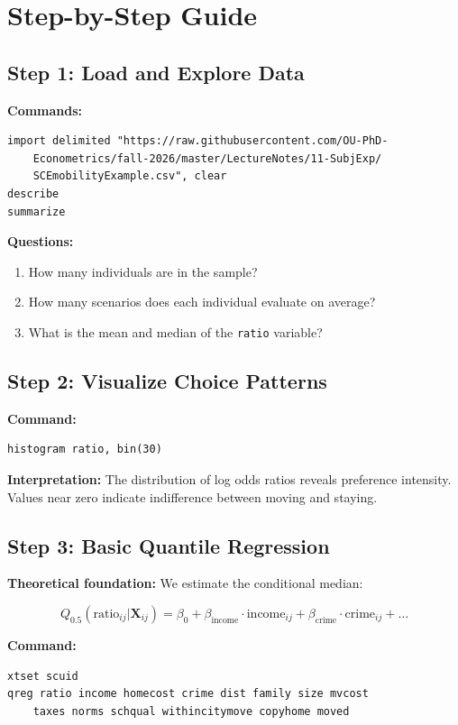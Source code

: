 \documentclass[12pt]{article}
\begin{document}
\section{Step-by-Step Guide}

\subsection{Step 1: Load and Explore Data}

\textbf{Commands:}
\begin{verbatim}
import delimited "https://raw.githubusercontent.com/OU-PhD-
    Econometrics/fall-2026/master/LectureNotes/11-SubjExp/
    SCEmobilityExample.csv", clear
describe
summarize
\end{verbatim}

\textbf{Questions:}
\begin{enumerate}
    \item How many individuals are in the sample?
    \item How many scenarios does each individual evaluate on average?
    \item What is the mean and median of the \texttt{ratio} variable?
\end{enumerate}

\subsection{Step 2: Visualize Choice Patterns}

\textbf{Command:}
\begin{verbatim}
histogram ratio, bin(30)
\end{verbatim}

\textbf{Interpretation:} The distribution of log odds ratios reveals preference intensity. Values near zero indicate indifference between moving and staying.

\subsection{Step 3: Basic Quantile Regression}

\textbf{Theoretical foundation:} We estimate the conditional median:

$$Q_{0.5}(\text{ratio}_{ij} | \mathbf{X}_{ij}) = \beta_0 + \beta_{\text{income}} \cdot \text{income}_{ij} + \beta_{\text{crime}} \cdot \text{crime}_{ij} + \ldots$$

\textbf{Command:}
\begin{verbatim}
xtset scuid
qreg ratio income homecost crime dist family size mvcost 
    taxes norms schqual withincitymove copyhome moved
\end{verbatim}
\end{document}
